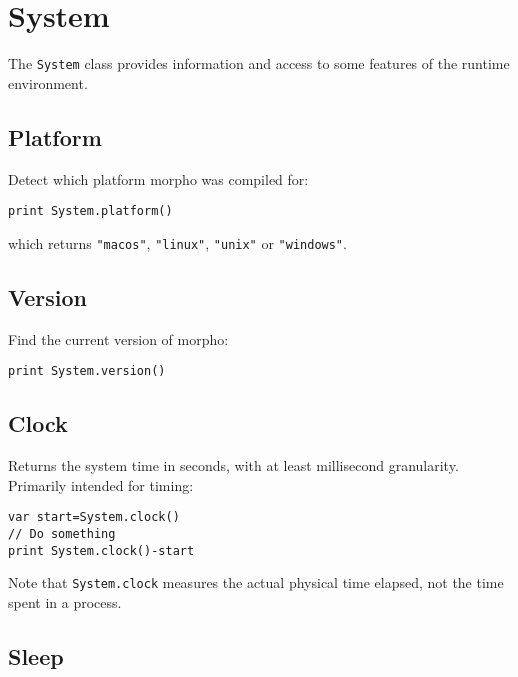 \hypertarget{system}{%
\section{System}\label{system}}

The \texttt{System} class provides information and access to some
features of the runtime environment.

\hypertarget{platform}{%
\subsection{Platform}\label{platform}}

Detect which platform morpho was compiled for:

\begin{lstlisting}
print System.platform() 
\end{lstlisting}

which returns \texttt{"macos"}, \texttt{"linux"}, \texttt{"unix"} or
\texttt{"windows"}.

\hypertarget{version}{%
\subsection{Version}\label{version}}

Find the current version of morpho:

\begin{lstlisting}
print System.version() 
\end{lstlisting}

\hypertarget{clock}{%
\subsection{Clock}\label{clock}}

Returns the system time in seconds, with at least millisecond
granularity. Primarily intended for timing:

\begin{lstlisting}
var start=System.clock() 
// Do something 
print System.clock()-start 
\end{lstlisting}

Note that \texttt{System.clock} measures the actual physical time
elapsed, not the time spent in a process.

\hypertarget{sleep}{%
\subsection{Sleep}\label{sleep}}

